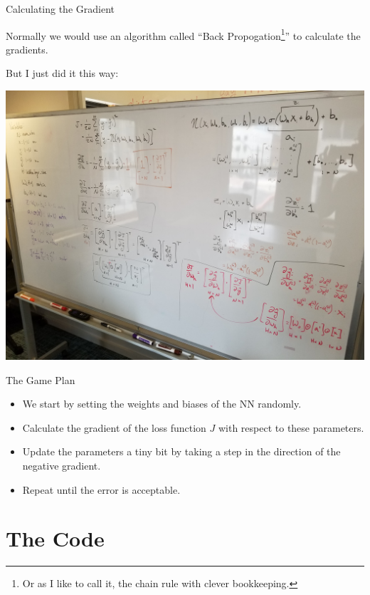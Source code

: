 \documentclass[11pt]{beamer}
\begin{document}
\begin{frame}{Calculating the Gradient}

Normally we would use an algorithm called ``Back Propogation\footnote{Or as I like to call it, the chain rule with clever bookkeeping.}'' to calculate the gradients.

\bigskip

But I just did it this way:

\begin{center}
\includegraphics[scale=0.04]{20180305_112255}
\end{center}

\end{frame}

\begin{frame}{The Game Plan}
\begin{itemize}
\item We start by setting the weights and biases of the NN randomly.
\item Calculate the gradient of the loss function $J$ with respect to these parameters.
\item Update the parameters a tiny bit by taking a step in the direction of the negative gradient.
\item Repeat until the error is acceptable.
\end{itemize}
\end{frame}

\section{The Code}
\end{document}
